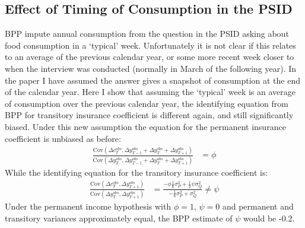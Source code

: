 \subsection{Effect of Timing of Consumption in the PSID} \label{typical_week}
BPP impute annual consumption from the question in the PSID asking about food consumption in a `typical' week. Unfortunately it is not clear if this relates to an average of the previous calendar year, or some more recent week closer to when the interview was conducted (normally in March of the following year). In the paper I have assumed the answer gives a snapshot of consumption at the end of the calendar year. Here I show that assuming the `typical' week is an average of consumption over the previous calendar year, the identifying equation from BPP for transitory insurance coefficient is different again, and still significantly biased. Under this new assumption the equation for the permanent insurance coefficient is unbiased as before:
\begin{align*}
\frac{\mathrm{Cov}(\Delta c^{obs}_{T}, \Delta y^{obs}_{T-1}+\Delta y^{obs}_{T}+\Delta y^{obs}_{T+1})}{\mathrm{Cov}(\Delta y^{obs}_{T}, \Delta y^{obs}_{T-1}+\Delta y^{obs}_{T}+\Delta y^{obs}_{T+1})}&= \phi
\end{align*}
While the identifying equation for the transitory insurance coefficient is:
\begin{align*}
\frac{\mathrm{Cov}(\Delta c^{obs}_{T},\Delta y^{obs}_{T+1})}{\mathrm{Cov}(\Delta y^{obs}_{T},\Delta y^{obs}_{T+1})} &= \frac{-\phi\frac{1}{6}\sigma^2_P + \frac{1}{2}\psi\sigma^2_Q}{-\frac{1}{6}\sigma^2_P + \sigma^2_Q} \neq \psi 
\end{align*}
Under the permanent income hypothesis with $\phi=1$, $\psi=0$ and permanent and transitory variances approximately equal, the BPP estimate of $\psi$ would be -0.2.